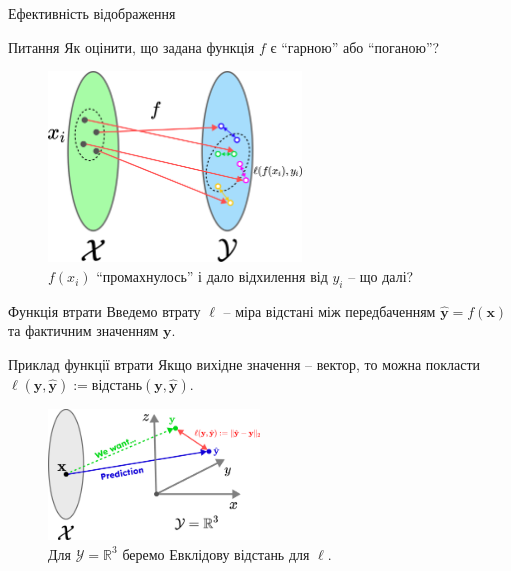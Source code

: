\documentclass{zkdl-presentation-template}
\begin{document}
    \begin{frame}{Ефективність відображення}	
        \begin{exampleblock}{Питання}
            Як оцінити, що задана функція $f$ є ``гарною'' або ``поганою''?
        \end{exampleblock}
        
        \begin{figure}
            \centering
            \includegraphics[width=0.6\textwidth]{images/loss.png}
            \caption{$f(x_i)$ ``промахнулось'' і дало відхилення від $y_i$ -- що далі?}
        \end{figure}
	\end{frame}

    \begin{frame}{Функція втрати}
        \textcolor{ForestGreen}{\cmark} Введемо втрату $\ell$ -- міра відстані між передбаченням $\hat{\boldsymbol{y}}=f(\boldsymbol{x})$ та фактичним значенням $\boldsymbol{y}$.
    
        \begin{exampleblock}{Приклад функції втрати}
            Якщо вихідне значення -- вектор, то можна покласти $\ell(\boldsymbol{y},\hat{\boldsymbol{y}}) := \text{відстань}(\boldsymbol{y},\hat{\boldsymbol{y}})$.
        \end{exampleblock}
    
        \begin{figure}
            \centering
            \includegraphics[width=0.5\textwidth]{images/loss_R3.png}
            \caption{Для $\mathcal{Y}=\mathbb{R}^3$ беремо Евклідову відстань для $\ell$.}
        \end{figure}
	\end{frame}
 
\end{document}

